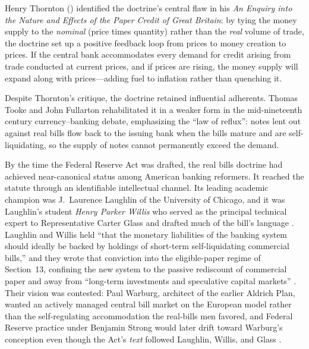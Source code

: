 \documentclass[12pt]{article}
\begin{document}
Henry Thornton (\citeyear{thornton1802}) identified the doctrine's central flaw
in his \emph{An Enquiry into the Nature and Effects of the Paper Credit of Great
Britain}: by tying the money supply to the \emph{nominal} (price times quantity)
rather than the \emph{real} volume of trade, the doctrine set up a positive
feedback loop from prices to money creation to prices.  If the central bank
accommodates every demand for credit arising from trade conducted at current prices,
and if prices are rising, the money supply will expand along with prices---adding
fuel to inflation rather than quenching it.

Despite Thornton's critique, the doctrine retained influential adherents.  Thomas
Tooke and John Fullarton rehabilitated it in a weaker form in the mid-nineteenth
century currency--banking debate, emphasizing the ``law of reflux'': notes lent
out against real bills flow back to the issuing bank when the bills mature and are
self-liquidating, so the supply of notes cannot permanently exceed the demand.

By the time the Federal Reserve Act was drafted, the real bills doctrine had
achieved near-canonical status among American banking reformers.  It reached the
statute through an identifiable intellectual channel.  Its leading academic
champion was J.\ Laurence Laughlin of the University of Chicago, and it was
Laughlin's student \emph{Henry Parker Willis} who served as the principal
technical expert to Representative Carter Glass and drafted much of the bill's
language \citep{mehrling2014economists}.  Laughlin and Willis held ``that the
monetary liabilities of the banking system should ideally be backed by holdings of
short-term self-liquidating commercial bills,'' and they wrote that conviction
into the eligible-paper regime of Section~13, confining the new system to the
passive rediscount of commercial paper and away from ``long-term investments and
speculative capital markets'' \citep{mehrling2014economists}.  Their vision was
contested: Paul Warburg, architect of the earlier Aldrich Plan, wanted an actively
managed central bill market on the European model rather than the self-regulating
accommodation the real-bills men favored, and Federal Reserve practice under
Benjamin Strong would later drift toward Warburg's conception even though the
Act's \emph{text} followed Laughlin, Willis, and Glass \citep{mehrling2014economists}.
\end{document}
